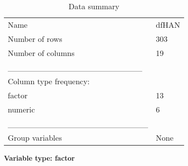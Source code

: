 \documentclass[
]{article}
\begin{document}
\begin{longtable}[]{@{}ll@{}}
\caption{Data summary}\tabularnewline
\toprule\noalign{}
\endfirsthead
\endhead
\bottomrule\noalign{}
\endlastfoot
Name & dfHAN \\
Number of rows & 303 \\
Number of columns & 19 \\
\_\_\_\_\_\_\_\_\_\_\_\_\_\_\_\_\_\_\_\_\_\_\_ & \\
Column type frequency: & \\
factor & 13 \\
numeric & 6 \\
\_\_\_\_\_\_\_\_\_\_\_\_\_\_\_\_\_\_\_\_\_\_\_\_ & \\
Group variables & None \\
\end{longtable}

\textbf{Variable type: factor}
\end{document}
